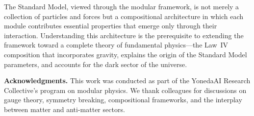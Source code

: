 \documentclass[12pt]{article}
\theoremstyle{definition}
\theoremstyle{remark}
\begin{document}
The Standard Model, viewed through the modular framework, is not merely a collection of particles and forces but a compositional architecture in which each module contributes essential properties that emerge only through their interaction. Understanding this architecture is the prerequisite to extending the framework toward a complete theory of fundamental physics---the Law~IV composition that incorporates gravity, explains the origin of the Standard Model parameters, and accounts for the dark sector of the universe.

\bigskip

\noindent\textbf{Acknowledgments.}
This work was conducted as part of the YonedaAI Research Collective's program on modular physics. We thank colleagues for discussions on gauge theory, symmetry breaking, compositional frameworks, and the interplay between matter and anti-matter sectors.
\end{document}

